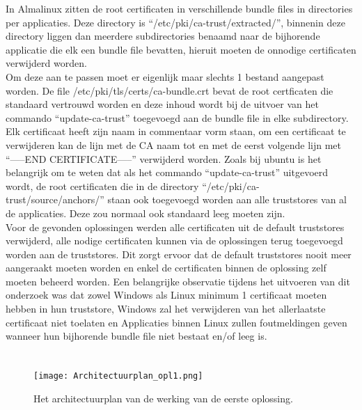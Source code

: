 In Almalinux zitten de root certificaten in verschillende bundle files in directories per applicaties. Deze directory is ``/etc/pki/ca-trust/extracted/'', binnenin deze directory liggen dan meerdere subdirectories benaamd naar de bijhorende applicatie die elk een bundle file bevatten, hieruit moeten de onnodige certificaten verwijderd worden. \\

Om deze aan te passen moet er eigenlijk maar slechts 1 bestand aangepast worden. De file /etc/pki/tls/certs/ca-bundle.crt bevat de root certficaten die standaard vertrouwd worden en deze inhoud wordt bij de uitvoer van het commando ``update-ca-trust'' toegevoegd aan de bundle file in elke subdirectory.
Elk certificaat heeft zijn naam in commentaar vorm staan, om een certificaat te verwijderen kan de lijn met de CA naam tot en met de eerst volgende lijn met ``-----END CERTIFICATE-----'' verwijderd worden.
Zoals bij ubuntu is het belangrijk om te weten dat als het commando ``update-ca-trust'' uitgevoerd wordt, de root certificaten die in de directory ``/etc/pki/ca-trust/source/anchors/'' staan ook toegevoegd worden aan alle truststores van al de applicaties. Deze zou normaal ook standaard leeg moeten zijn. \\

Voor de gevonden oplossingen werden alle certificaten uit de default truststores verwijderd, alle nodige certificaten kunnen via de oplossingen terug toegevoegd worden aan de truststores. Dit zorgt ervoor dat de default truststores nooit meer aangeraakt moeten worden en enkel de certificaten binnen de oplossing zelf moeten beheerd worden.
Een belangrijke observatie tijdens het uitvoeren van dit onderzoek was dat zowel Windows als Linux minimum 1 certificaat moeten hebben in hun truststore, Windows zal het verwijderen van het allerlaatste certificaat niet toelaten en Applicaties binnen Linux zullen foutmeldingen geven wanneer hun bijhorende bundle file niet bestaat en/of leeg is. \\

\pagebreak

\section{}%
\label{sec:Eerste_oplossing}

\begin{figure}[H]
  \centering
  \texttt{[image: Architectuurplan\_opl1.png]}
  \caption[Architectuurplan van de eerste oplossing]{\label{fig:opl1} Het architectuurplan van de werking van de eerste oplossing.}
\end{figure}


